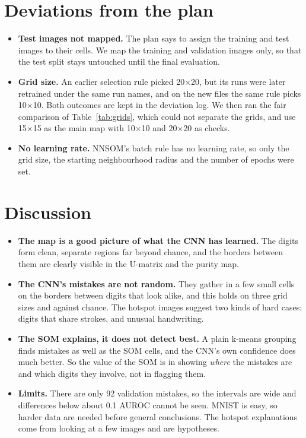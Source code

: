 \documentclass[11pt]{article}
\begin{document}
\section{Deviations from the plan}

\begin{itemize}[leftmargin=1.4em, itemsep=2pt]
\item \textbf{Test images not mapped.} The plan says to assign the training and test images to their cells. We map the training and validation images only, so that the test split stays untouched until the final evaluation.
\item \textbf{Grid size.} An earlier selection rule picked 20$\times$20, but its runs were later retrained under the same run names, and on the new files the same rule picks 10$\times$10. Both outcomes are kept in the deviation log. We then ran the fair comparison of Table~\ref{tab:grids}, which could not separate the grids, and use 15$\times$15 as the main map with 10$\times$10 and 20$\times$20 as checks.
\item \textbf{No learning rate.} NNSOM's batch rule has no learning rate, so only the grid size, the starting neighbourhood radius and the number of epochs were set.
\end{itemize}

\section{Discussion}
\begin{itemize}[leftmargin=1.4em, itemsep=2pt]
\item \textbf{The map is a good picture of what the CNN has learned.} The digits form clean, separate regions far beyond chance, and the borders between them are clearly visible in the U-matrix and the purity map.
\item \textbf{The CNN's mistakes are not random.} They gather in a few small cells on the borders between digits that look alike, and this holds on three grid sizes and against chance. The hotspot images suggest two kinds of hard cases: digits that share strokes, and unusual handwriting.
\item \textbf{The SOM explains, it does not detect best.} A plain k-means grouping finds mistakes as well as the SOM cells, and the CNN's own confidence does much better. So the value of the SOM is in showing \emph{where} the mistakes are and which digits they involve, not in flagging them.
\item \textbf{Limits.} There are only 92 validation mistakes, so the intervals are wide and differences below about 0.1 AUROC cannot be seen. MNIST is easy, so harder data are needed before general conclusions. The hotspot explanations come from looking at a few images and are hypotheses.
\end{itemize}
\end{document}

